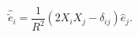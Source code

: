 \begin{equation}
\label{erotation}
{\hat {\tilde e}}_i = \frac{1}{R^2} \left( 2 X_i X_j - \delta_{i j}\right) {\hat
e}_j.
\end{equation}

